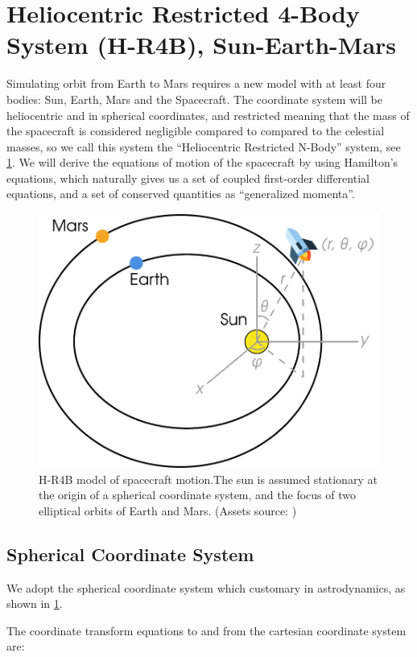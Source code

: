 \section{Heliocentric Restricted 4-Body System (H-R4B), Sun-Earth-Mars}
Simulating orbit from Earth to Mars requires a new model with at least four bodies: Sun, Earth, Mars and the Spacecraft. The coordinate system will be heliocentric and in spherical coordinates, and restricted meaning that the mass of the spacecraft is considered negligible compared to compared to the celestial masses, so we call this system the ``Heliocentric Restricted N-Body'' system, see \cref{fig:solar-system-model}. We will derive the equations of motion of the spacecraft by using Hamilton's equations, which naturally gives us a set of coupled first-order differential equations, and a set of conserved quantities as ``generalized momenta''.

\begin{figure}[ht]
    \centering
    \includegraphics[width=0.80\linewidth]{fig/solar-system-model}
    \caption{ H-R4B model of spacecraft motion.The sun is assumed stationary at the origin of a spherical coordinate system, and the focus of two elliptical orbits of Earth and Mars. (Assets source: \cite{WikiSpherical,flaticon})}
    \label{fig:solar-system-model}
\end{figure}

\subsection{Spherical Coordinate System}
We adopt the spherical coordinate system which customary in astrodynamics, as shown in \cref{fig:solar-system-model}.

The coordinate transform equations to and from the cartesian coordinate system are:

